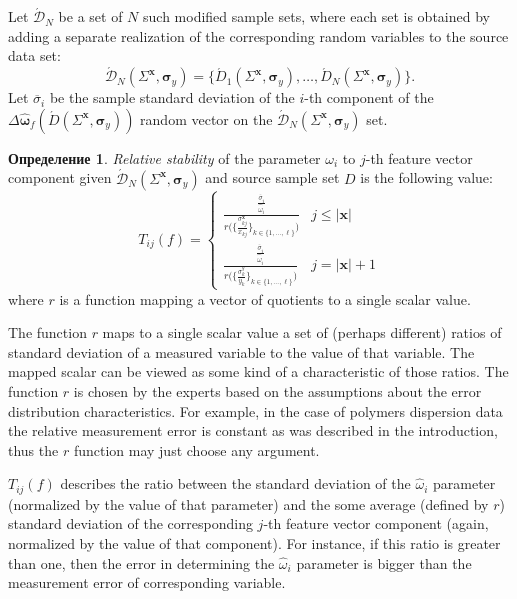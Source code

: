 \documentclass[11pt,a4paper]{article}
\theoremstyle{definition}
\newtheorem{defin}{Определение}
\begin{document}
Let $\acute{\mathcal{D}}_N$ be a set of $N$ such modified sample sets, where each
set is obtained by adding a separate realization of the corresponding random variables
to the source data set:
\[
  \acute{\mathcal{D}}_N (\Sigma^{\mathbf{x}}, \boldsymbol{\sigma}_y) = \{ \acute{D}_1 (\Sigma^{\mathbf{x}}, \boldsymbol{\sigma}_y), \dots, \acute{D}_N (\Sigma^{\mathbf{x}}, \boldsymbol{\sigma}_y) \}.
\]
Let $\overline{\sigma}_i$ be the sample standard deviation of the $i$-th component of the
$\Delta\hat{\boldsymbol{\omega}}_f(\acute{D} (\Sigma^{\mathbf{x}}, \boldsymbol{\sigma}_y) )$
random vector on the $\acute{\mathcal{D}}_N (\Sigma^{\mathbf{x}}, \boldsymbol{\sigma}_y)$ set.
\begin{defin}
\emph{Relative stability} of the parameter $\omega_i$ to $j$-th feature vector component
given $\acute{\mathcal{D}}_N (\Sigma^{\mathbf{x}}, \boldsymbol{\sigma}_y)$
and source sample set $D$ is the following value:
\begin{equation}
  T_{ij}(f) =
	\begin{cases}
	  \displaystyle \frac{\frac{\overline{\sigma}_i}{\hat{\omega}_i}}{r\big(\{ \frac{\sigma_{kj}^{\mathbf{x}}}{x_{kj}} \}_{k \in \{ 1, \dots, \ell \}}\big)} & j \leq |\mathbf{x}| \\
	  \displaystyle \frac{\frac{\overline{\sigma}_i}{\hat{\omega}_i}}{r\big(\{ \frac{\sigma_{k}^{y}}{y_k} \}_{k \in \{ 1, \dots, \ell \}}\big)} & j = |\mathbf{x}| + 1
	\end{cases}
  \label{eq:t_rel}
\end{equation}
where $r$ is a function mapping a vector of quotients to a single scalar value.
\end{defin}

The function $r$ maps to a single scalar value a set of (perhaps different) ratios of standard
deviation of a measured variable to the value of that variable. The mapped scalar can be
viewed as some kind of a characteristic of those ratios. The function $r$ is chosen by the
experts based on the assumptions about the error distribution characteristics. For example,
in the case of polymers dispersion data the relative measurement error is constant as was
described in the introduction, thus the $r$ function may just choose any argument.

$T_{ij}(f)$ describes the ratio between the standard deviation of the $\hat{\omega}_i$ parameter
(normalized by the value of that parameter) and the some average (defined by $r$)
standard deviation of the corresponding $j$-th feature vector component (again, normalized by
the value of that component).
For instance, if this ratio is greater than one, then the error in determining the $\hat{\omega}_i$
parameter is bigger than the measurement error of corresponding variable.
\end{document}
